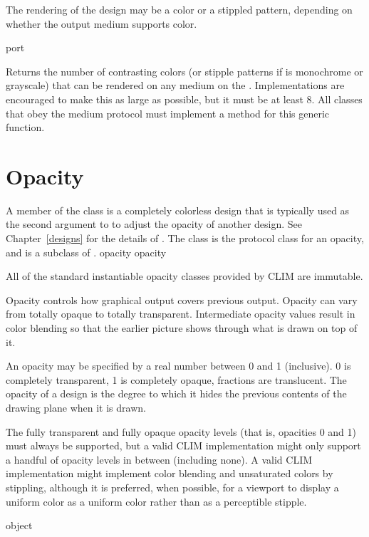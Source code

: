 The rendering of the design may be a color or a stippled pattern, depending on
whether the output medium supports color.

 {port}

Returns the number of contrasting colors (or stipple patterns if  is
monochrome or grayscale) that can be rendered on any medium on the 
.  Implementations are encouraged to make this as large as possible,
but it must be at least 8.  All classes that obey the medium protocol must
implement a method for this generic function.


\section {Opacity}


A member of the class  is a completely colorless design that is
typically used as the second argument to  to adjust the opacity
of another design.  See Chapter~\ref{designs} for the details of
.  The  class is the protocol class for an opacity,
and is a subclass of .
 {opacity} {opacity}

All of the standard instantiable opacity classes provided by CLIM are immutable.

Opacity controls how graphical output covers previous output.  Opacity can vary
from totally opaque to totally transparent.  Intermediate opacity values result
in color blending so that the earlier picture shows through what is drawn on top
of it.

An opacity may be specified by a real number between 0 and 1 (inclusive).  0 is
completely transparent, 1 is completely opaque, fractions are translucent.  The
opacity of a design is the degree to which it hides the previous contents of the
drawing plane when it is drawn.

The fully transparent and fully opaque opacity levels (that is, opacities 0 and
1) must always be supported, but a valid CLIM implementation might only support
a handful of opacity levels in between (including none).  A valid CLIM
implementation might implement color blending and unsaturated colors by
stippling, although it is preferred, when possible, for a viewport to display a
uniform color as a uniform color rather than as a perceptible stipple.

 {object}

